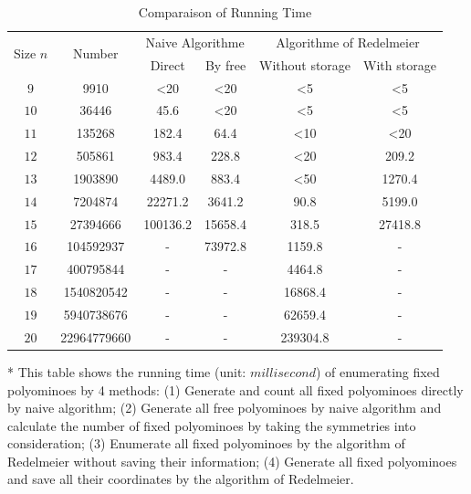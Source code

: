 \documentclass[a4paper,12pt]{article}
\begin{document}
	\begin{table}[h]
		\centering
		\caption{Comparaison of Running Time}
		\begin{tabular}{c|c|c|c|c|c}
			\hline\hline
			\multirow{2}{*}{Size $n$}&\multirow{2}{*}{Number}&\multicolumn{2}{c|}{Naive Algorithme}&\multicolumn{2}{c}{Algorithme of Redelmeier}\\
			\cline{3-6}
			&&Direct&By free&Without storage&With storage\\
			\hline
			$9$&9910&<20&<20&<5&<5\\
			$10$&36446&45.6&<20&<5&<5\\
			$11$&135268&182.4&64.4&<10&<20\\
			$12$&505861&983.4&228.8&<20&209.2\\
			$13$&1903890&4489.0&883.4&<50&1270.4\\
			$14$&7204874&22271.2&3641.2&90.8&5199.0\\
			$15$&27394666&100136.2&15658.4&318.5&27418.8\\
			$16$&104592937&-&73972.8&1159.8&-\\
			$17$&400795844&-&-&4464.8&-\\
			$18$&1540820542&-&-&16868.4&-\\
			$19$&5940738676&-&-&62659.4&-\\
			$20$&22964779660&-&-&239304.8&-\\
			\hline
		\end{tabular}
		\label{tab:speed}
		\begin{tablenotes}\footnotesize
			\item [*] This table shows the running time (unit: $millisecond$) of enumerating fixed polyominoes by 4 methods: (1) Generate and count all fixed polyominoes directly by naive algorithm; (2) Generate all free polyominoes by naive algorithm and calculate the number of fixed polyominoes by taking the symmetries into consideration; (3) Enumerate all fixed polyominoes by the algorithm of Redelmeier without saving their information; (4) Generate all fixed polyominoes and save all their coordinates by the algorithm of Redelmeier.
		\end{tablenotes}
	\end{table}
\end{document}
